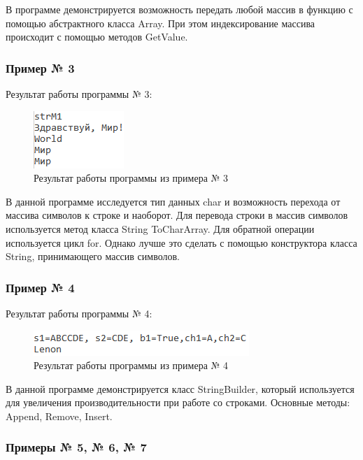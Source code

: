 \documentclass[a4paper,14pt]{extarticle}
\begin{document}
    В программе демонстрируется возможность передать любой массив
    в функцию с помощью абстрактного класса Array. При этом индексирование
    массива происходит с помощью методов GetValue.

    \subsubsection{Пример № 3}

    Результат работы программы № 3:

    \begin{figure}[H]
        \centering
        \includegraphics[width=.4\textwidth]{Example3}
        \caption{Результат работы программы из примера № 3}
    \end{figure}

    В данной программе исследуется тип данных char и возможность
    перехода от массива символов к строке и наоборот. Для перевода
    строки в массив символов используется метод класса String ToCharArray.
    Для обратной операции используется цикл for. Однако лучше это сделать 
    с помощью конструктора класса String, принимающего массив символов.

    \subsubsection{Пример № 4}

    Результат работы программы № 4:

    \begin{figure}[H]
        \centering
        \includegraphics[width=.4\textwidth]{Example4}
        \caption{Результат работы программы из примера № 4}
    \end{figure}

    В данной программе демонстрируется класс StringBuilder, который
    используется для увеличения производительности при работе со строками.
    Основные методы: Append, Remove, Insert.

    \subsubsection{Примеры № 5, № 6, № 7}
\end{document}
